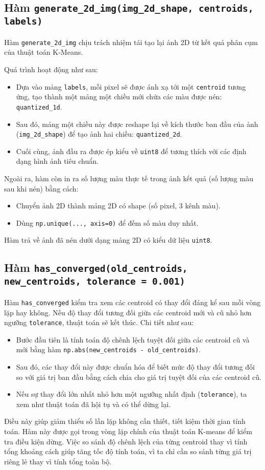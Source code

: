 \subsection{Hàm \texttt{generate\_2d\_img(img\_2d\_shape, centroids, labels)}}

Hàm \texttt{generate\_2d\_img} chịu trách nhiệm tái tạo lại ảnh 2D từ kết quả phân cụm của thuật toán K-Means.

Quá trình hoạt động như sau:

\begin{itemize}
  \item Dựa vào mảng \texttt{labels}, mỗi pixel sẽ được ánh xạ tới một \texttt{centroid} tương ứng, tạo thành một mảng một chiều mới chứa các màu được nén: \texttt{quantized\_1d}.
  \item Sau đó, mảng một chiều này được reshape lại về kích thước ban đầu của ảnh (\texttt{img\_2d\_shape}) để tạo ảnh hai chiều: \texttt{quantized\_2d}.
  \item Cuối cùng, ảnh đầu ra được ép kiểu về \texttt{uint8} để tương thích với các định dạng hình ảnh tiêu chuẩn.
\end{itemize}

Ngoài ra, hàm còn in ra số lượng màu thực tế trong ảnh kết quả (số lượng màu sau khi nén) bằng cách:
\begin{itemize}
  \item Chuyển ảnh 2D thành mảng 2D có shape (số pixel, 3 kênh màu).
  \item Dùng \texttt{np.unique(..., axis=0)} để đếm số màu duy nhất.
\end{itemize}

Hàm trả về ảnh đã nén dưới dạng mảng 2D có kiểu dữ liệu \texttt{uint8}.

\subsection{Hàm \texttt{has\_converged(old\_centroids, new\_centroids, tolerance = 0.001)}}

Hàm \texttt{has\_converged} kiểm tra xem các centroid có thay đổi đáng kể sau mỗi vòng lặp hay không. Nếu độ thay đổi tương đối giữa các centroid mới và cũ nhỏ hơn ngưỡng \texttt{tolerance}, thuật toán sẽ kết thúc. Chi tiết như sau:
\begin{itemize}
	\item Bước đầu tiên là tính toán độ chênh lệch tuyệt đối giữa các centroid cũ và mới bằng hàm \texttt{np.abs(new\_centroids - old\_centroids)}.
	\item Sau đó, các thay đổi này được chuẩn hóa để biết mức độ thay đổi tương đối so với giá trị ban đầu bằng cách chia cho giá trị tuyệt đối của các centroid cũ.
	\item Nếu sự thay đổi lớn nhất nhỏ hơn một ngưỡng nhất định (\texttt{tolerance}), ta xem như thuật toán đã hội tụ và có thể dừng lại.
\end{itemize}

Điều này giúp giảm thiểu số lần lặp không cần thiết, tiết kiệm thời gian tính toán. Hàm này được gọi trong vòng lặp chính của thuật toán K-means để kiểm tra điều kiện dừng. Việc so sánh độ chênh lệch của từng centroid thay vì tính tổng khoảng cách giúp tăng tốc độ tính toán, vì ta chỉ cần so sánh từng giá trị riêng lẻ thay vì tính tổng toàn bộ.